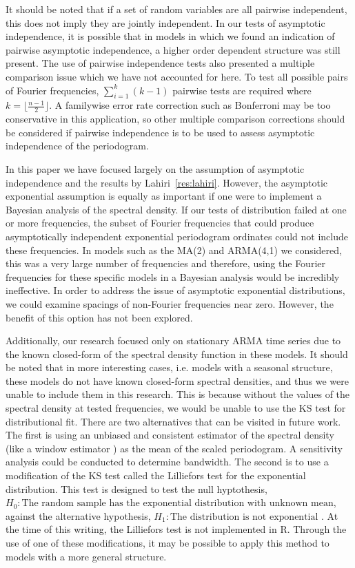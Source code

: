 \documentclass{article}\usepackage[]{graphicx}\usepackage[]{color}
\theoremstyle{plain}
\begin{document}
It should be noted that if a set of random variables are all pairwise independent, this does not imply they are jointly independent. In our tests of asymptotic independence, it is possible that in models in which we found an indication of pairwise asymptotic independence, a higher order dependent structure was still present. The use of pairwise independence tests also presented a multiple comparison issue which we have not accounted for here. To test all possible pairs of Fourier frequencies, $\sum_{i=1}^k (k-1)$ pairwise tests are required where $k=\lfloor\frac{n-1}{2}\rfloor$. A familywise error rate correction such as Bonferroni may be too conservative in this application, so other multiple comparison corrections should be considered if pairwise independence is to be used to assess asymptotic independence of the periodogram.

In this paper we have focused largely on the assumption of asymptotic independence and the results by Lahiri~\ref{res:lahiri}. However, the asymptotic exponential assumption is equally as important if one were to implement a Bayesian analysis of the spectral density. If our tests of distribution failed at one or more frequencies, the subset of Fourier frequencies that could produce asymptotically independent exponential periodogram ordinates could not include these frequencies. In models such as the MA(2) and ARMA(4,1) we considered, this was a very large number of frequencies and therefore, using the Fourier frequencies for these specific models in a Bayesian analysis would be incredibly ineffective. In order to address the issue of asymptotic exponential distributions, we could examine spacings of non-Fourier frequencies near zero. However, the benefit of this option has not been explored.

Additionally, our research focused only on stationary ARMA time series due to the known closed-form of the spectral density function in these models. It should be noted that in more interesting cases, i.e. models with a seasonal structure, these models do not have known closed-form spectral densities, and thus we were unable to include them in this research. This is because without the values of the spectral density at tested frequencies, we would be unable to use the KS test for distributional fit. There are two alternatives that can be visited in future work. The first is using an unbiased and consistent estimator of the spectral density (like a window estimator \cite{brockwell2002introduction}) as the mean of the scaled periodogram. A sensitivity analysis could be conducted to determine bandwidth. The second is to use a modification of the KS test called the Lilliefors test for the exponential distribution. This test is designed to test the null hyptothesis, $H_0: \text{The random sample has the exponential distribution with unknown mean}$, against the alternative hypothesis, $H_1: \text{The distribution is not exponential}$ \cite{conover1998practical}. At the time of this writing, the Lilliefors test is not implemented in R. Through the use of one of these modifications, it may be possible to apply this method to models with a more general structure.
\end{document}
